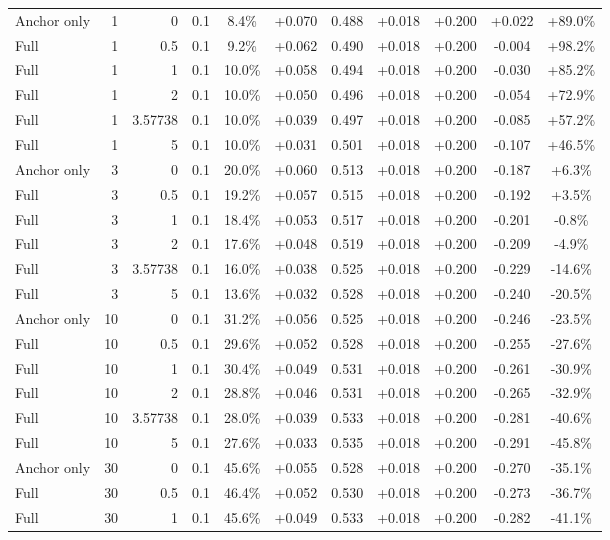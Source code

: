 \begin{table}[htbp]
\begin{tabular}{lrrrccccccc}
Anchor only & 1 & 0 & 0.1 & 8.4\% & +0.070 & 0.488 & +0.018 & +0.200 & +0.022 & +89.0\% \\
Full & 1 & 0.5 & 0.1 & 9.2\% & +0.062 & 0.490 & +0.018 & +0.200 & -0.004 & +98.2\% \\
Full & 1 & 1 & 0.1 & 10.0\% & +0.058 & 0.494 & +0.018 & +0.200 & -0.030 & +85.2\% \\
Full & 1 & 2 & 0.1 & 10.0\% & +0.050 & 0.496 & +0.018 & +0.200 & -0.054 & +72.9\% \\
Full & 1 & 3.57738 & 0.1 & 10.0\% & +0.039 & 0.497 & +0.018 & +0.200 & -0.085 & +57.2\% \\
Full & 1 & 5 & 0.1 & 10.0\% & +0.031 & 0.501 & +0.018 & +0.200 & -0.107 & +46.5\% \\
Anchor only & 3 & 0 & 0.1 & 20.0\% & +0.060 & 0.513 & +0.018 & +0.200 & -0.187 & +6.3\% \\
Full & 3 & 0.5 & 0.1 & 19.2\% & +0.057 & 0.515 & +0.018 & +0.200 & -0.192 & +3.5\% \\
Full & 3 & 1 & 0.1 & 18.4\% & +0.053 & 0.517 & +0.018 & +0.200 & -0.201 & -0.8\% \\
Full & 3 & 2 & 0.1 & 17.6\% & +0.048 & 0.519 & +0.018 & +0.200 & -0.209 & -4.9\% \\
Full & 3 & 3.57738 & 0.1 & 16.0\% & +0.038 & 0.525 & +0.018 & +0.200 & -0.229 & -14.6\% \\
Full & 3 & 5 & 0.1 & 13.6\% & +0.032 & 0.528 & +0.018 & +0.200 & -0.240 & -20.5\% \\
Anchor only & 10 & 0 & 0.1 & 31.2\% & +0.056 & 0.525 & +0.018 & +0.200 & -0.246 & -23.5\% \\
Full & 10 & 0.5 & 0.1 & 29.6\% & +0.052 & 0.528 & +0.018 & +0.200 & -0.255 & -27.6\% \\
Full & 10 & 1 & 0.1 & 30.4\% & +0.049 & 0.531 & +0.018 & +0.200 & -0.261 & -30.9\% \\
Full & 10 & 2 & 0.1 & 28.8\% & +0.046 & 0.531 & +0.018 & +0.200 & -0.265 & -32.9\% \\
Full & 10 & 3.57738 & 0.1 & 28.0\% & +0.039 & 0.533 & +0.018 & +0.200 & -0.281 & -40.6\% \\
Full & 10 & 5 & 0.1 & 27.6\% & +0.033 & 0.535 & +0.018 & +0.200 & -0.291 & -45.8\% \\
Anchor only & 30 & 0 & 0.1 & 45.6\% & +0.055 & 0.528 & +0.018 & +0.200 & -0.270 & -35.1\% \\
Full & 30 & 0.5 & 0.1 & 46.4\% & +0.052 & 0.530 & +0.018 & +0.200 & -0.273 & -36.7\% \\
Full & 30 & 1 & 0.1 & 45.6\% & +0.049 & 0.533 & +0.018 & +0.200 & -0.282 & -41.1\% \\

\end{tabular}
\end{table}
